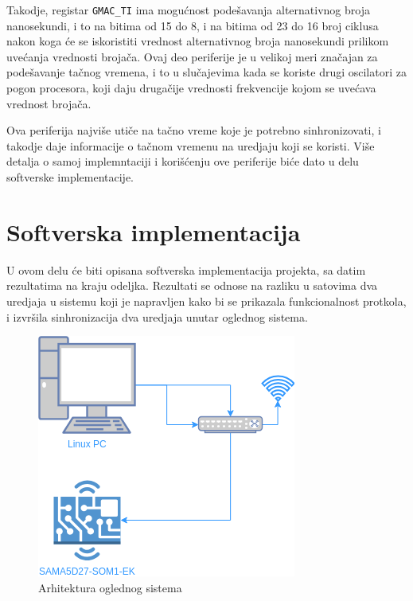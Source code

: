 \documentclass[a4paper,12pt, master]{etf}
\begin{document}
	Takodje, registar \verb|GMAC_TI| ima mogu\'{c}nost pode\v{s}avanja alternativnog
	broja nanosekundi, i to na bitima od 15 do 8, i na bitima od 23 do 16 broj
	ciklusa nakon koga \'{c}e se iskoristiti vrednost alternativnog broja
	nanosekundi prilikom uve\'{c}anja vrednosti broja\v{c}a. Ovaj deo
	periferije je u velikoj meri zna\v{c}ajan za pode\v{s}avanje ta\v{c}nog
	vremena, i to u slu\v{c}ajevima kada se koriste drugi oscilatori za pogon
	procesora, koji daju druga\v{c}ije vrednosti frekvencije kojom se
	uve\'{c}ava vrednost broja\v{c}a.

    Ova periferija najvi\v{s}e uti\v{c}e na ta\v{c}no vreme koje je potrebno
    sinhronizovati, i takodje daje informacije o ta\v{c}nom vremenu na uredjaju
    koji se koristi. Vi\v{s}e detalja o samoj implemntaciji i kori\v{s}\'{c}enju
    ove periferije bi\'{c}e dato u delu softverske implementacije.

	\newpage

	\chapter{Softverska implementacija}

    U ovom delu \'{c}e biti opisana softverska implementacija projekta, sa
	datim rezultatima na kraju odeljka. Rezultati se odnose na razliku u
	satovima dva uredjaja u sistemu koji je napravljen kako bi se prikazala
	funkcionalnost protkola, i izvr\v{s}ila sinhronizacija dva uredjaja unutar
	oglednog sistema.

	\begin{figure}[htb]
			\centering
			\includegraphics[scale=.5]{../pic/arch.png}
			\caption{Arhitektura oglednog sistema}
			\label{fig:arch_system}
	\end{figure}
\end{document}

